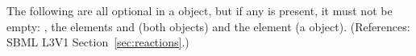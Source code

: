 \removedRule
  {The following are all optional in a \Reaction object, but if any is
present, it must not be empty: \KineticLaw, the elements
 and  (both
\ListOfSpeciesReferences objects) and the element 
(a \ListOfModifierSpeciesReferences object).}
  {(References: SBML L3V1 Section~\ref{sec:reactions}.)}


